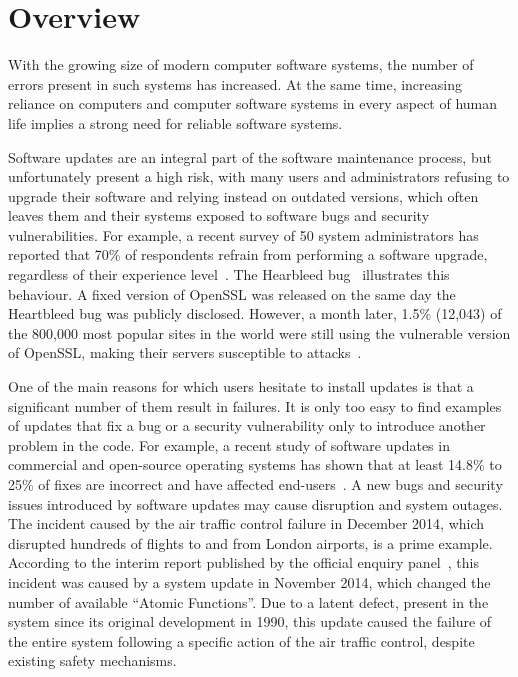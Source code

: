 \chapter{Overview}
\label{chap:overview}

With the growing size of modern computer software systems, the number of errors
present in such systems has increased. At the same time, increasing reliance on
computers and computer software systems in every aspect of human life implies a
strong need for reliable software systems.

Software updates are an integral part of the software maintenance process, but
unfortunately present a high risk, with many users and administrators refusing
to upgrade their software and relying instead on outdated versions, which often
leaves them and their systems exposed to software bugs and security
vulnerabilities. For example, a recent survey of 50 system administrators has
reported that 70\% of respondents refrain from performing a software upgrade,
regardless of their experience level~\cite{crameri:updates}. The Hearbleed
bug~\cite{heartbleed} illustrates this behaviour. A fixed version of OpenSSL
was released on the same day the Heartbleed bug was publicly disclosed.
However, a month later, 1.5\% (12,043) of the 800,000 most popular sites in the
world were still using the vulnerable version of OpenSSL, making their servers
susceptible to attacks~\cite{heartbleed-prevalent}.

One of the main reasons for which users hesitate to install updates is that a
significant number of them result in failures. It is only too easy to find
examples of updates that fix a bug or a security vulnerability only to
introduce another problem in the code. For example, a recent study of software
updates in commercial and open-source operating systems has shown that at least
14.8\% to 25\% of fixes are incorrect and have affected end-users~\cite{yin11}.
A new bugs and security issues introduced by software updates may cause
disruption and system outages. The incident caused by the air traffic control
failure in December 2014, which disrupted hundreds of flights to and from
London airports, is a prime example.  According to the interim report published
by the official enquiry panel~\cite{natsfailure}, this incident was caused by a
system update in November 2014, which changed the number of available ``Atomic
Functions''.  Due to a latent defect, present in the system since its original
development in 1990, this update caused the failure of the entire system
following a specific action of the air traffic control, despite existing safety
mechanisms.

